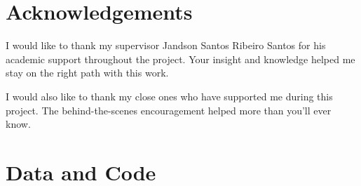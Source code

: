

\chapter{Acknowledgements}\label{chap:acknowledgements}
I would like to thank my supervisor Jandson Santos Ribeiro Santos for his academic support throughout the project. Your insight and knowledge helped me stay on the right path with this work.

I would also like to thank my close ones who have supported me during this project. The behind-the-scenes encouragement helped more than you'll ever know. 


\chapter{Data and Code}\label{chap:datacode}


